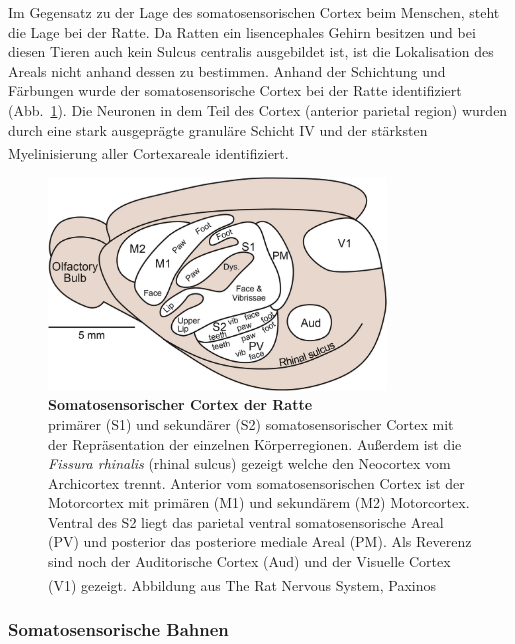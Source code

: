 \documentclass[12pt,a4paper,pdftex]{article}
\begin{document}
Im Gegensatz zu der Lage des somatosensorischen Cortex beim Menschen, steht die Lage bei der Ratte. Da Ratten ein lisencephales Gehirn besitzen und bei diesen Tieren auch kein Sulcus centralis ausgebildet ist, ist die Lokalisation des Areals nicht anhand dessen zu bestimmen. Anhand der Schichtung und Färbungen wurde der somatosensorische Cortex bei der Ratte identifiziert (Abb.~\ref{fig:S1_Cortex_Ratte}). Die Neuronen in dem Teil des Cortex (anterior parietal region) wurden durch eine stark ausgeprägte granuläre Schicht IV und der stärksten Myelinisierung aller Cortexareale identifiziert. \textsuperscript{\cite[22]{paxinos2014rat}}
\\
\begin{figure}[H]
    \centering
    \includegraphics[width = 0.8\textwidth] {pictures/somatosensory/Somato_cortex_ratte.png}
    \caption[Somatosensorischer Cortex der Ratte]{\textbf{Somatosensorischer Cortex der Ratte}\\
    primärer (S1) und sekundärer (S2) somatosensorischer Cortex mit der Repräsentation der einzelnen Körperregionen. Außerdem ist die \textit{Fissura rhinalis} (rhinal sulcus) gezeigt welche den Neocortex vom Archicortex trennt. Anterior vom somatosensorischen Cortex ist der Motorcortex mit primären (M1) und sekundärem (M2) Motorcortex. Ventral des S2 liegt das parietal ventral somatosensorische Areal (PV) und posterior das posteriore mediale Areal (PM). Als Reverenz sind noch der Auditorische Cortex (Aud) und der Visuelle Cortex (V1) gezeigt. Abbildung aus The Rat Nervous System, Paxinos \textsuperscript{\cite[24]{paxinos2014rat}}}
    \label{fig:S1_Cortex_Ratte}
\end{figure}

\subsubsection*{Somatosensorische Bahnen}
\end{document}
